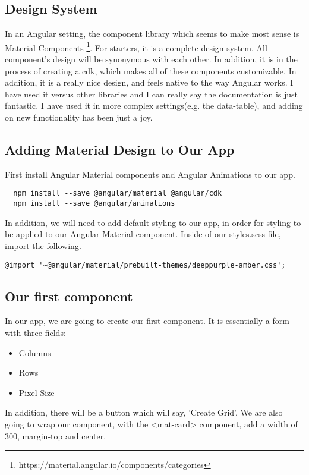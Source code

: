 \subsection{ Design System }
In an Angular setting, the component library which seems to make most sense is
Material Components
\footnote{https://material.angular.io/components/categories}. For starters, it
is a complete design system. All component's design will be synonymous with
each other. In addition, it is in the process of creating a cdk, which makes
all of these components customizable. In addition, it is a really nice design,
and feels native to the way Angular works. I have used it versus other libraries
and I can really say the documentation is just fantastic. I have used it in more
complex settings(e.g. the data-table), and adding on new functionality has been
just a joy.

\subsection{ Adding Material Design to Our App }
First install Angular Material components and Angular Animations to our app.
\begin{verbatim}
  npm install --save @angular/material @angular/cdk
  npm install --save @angular/animations
\end{verbatim}

In addition, we will need to add default styling to our app, in order for
styling to be applied to our Angular Material component. Inside of our
styles.scss file, import the following.
\begin{verbatim}
@import '~@angular/material/prebuilt-themes/deeppurple-amber.css';
\end{verbatim}

\subsection{ Our first component }
In our app, we are going to create our first component. It is essentially a form
with three fields:
\begin{itemize}
  \item Columns
  \item Rows
  \item Pixel Size
\end{itemize}

In addition, there will be a button which will say, 'Create Grid'. We are also
going to wrap our component, with the <mat-card> component, add a width of
300, margin-top and center.

